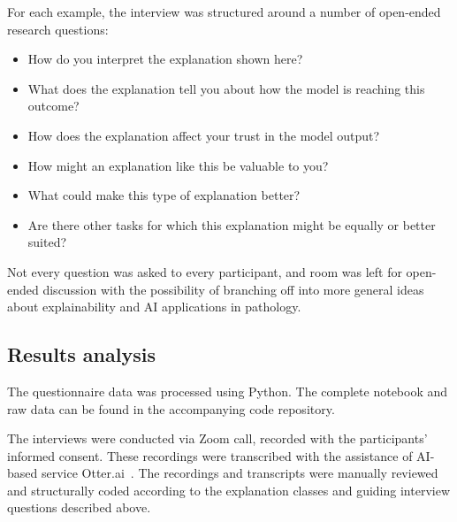 For each example, the interview was structured around a number of open-ended research questions: 

\begin{itemize}
    \item How do you interpret the explanation shown here?
    \item What does the explanation tell you about how the model is reaching this outcome?
    \item How does the explanation affect your trust in the model output?
    \item How might an explanation like this be valuable to you?
    \item What could make this type of explanation better?
    \item Are there other tasks for which this explanation might be equally or better suited?
\end{itemize}

Not every question was asked to every participant, and room was left for open-ended discussion with the possibility of branching off into more general ideas about explainability and AI applications in pathology.

\subsection{Results analysis}

The questionnaire data was processed using Python. The complete notebook and raw data can be found in the accompanying code repository.

The interviews were conducted via Zoom call, recorded with the participants' informed consent. These recordings were transcribed with the assistance of AI-based service Otter.ai~\cite{otterai-2021}. The recordings and transcripts were manually reviewed and structurally coded according to the explanation classes and guiding interview questions described above.